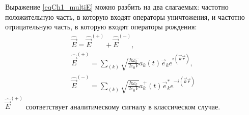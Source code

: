 Выражение \eqref{eqCh1_multiE} можно разбить на два слагаемых:
частотно положительную часть, в которую входят операторы уничтожения,
и частотно отрицательную часть, в которую входят операторы рождения: 
\begin{eqnarray}
\hat{\vec{E}} = \hat{\vec{E}}^{(+)} + \hat{\vec{E}}^{(-)},
\nonumber \\
\hat{\vec{E}}^{(+)} = \sum_{(k)} \sqrt{\frac{\hbar \omega_k}{2 \varepsilon_0
V}} \hat{a}_k\left(t\right) \vec{e}_k e^{i \left(\vec{k}\vec{r}
  \right)}, 
\nonumber \\
\hat{\vec{E}}^{(-)} = \sum_{(k)} \sqrt{\frac{\hbar \omega_k}{2 \varepsilon_0
V}}
\hat{a}_k^{+}\left(t\right) \vec{e}_k^{*} e^{-i \left(\vec{k}\vec{r} \right)}
\label{eqCh1_79}
\end{eqnarray} 
$\hat{\vec{E}}^{(+)}$ соответствует аналитическому сигналу в
классическом случае. 
